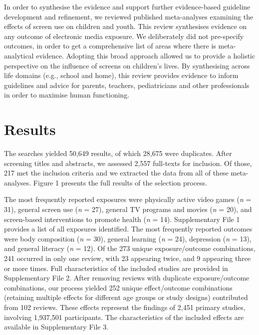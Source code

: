 \documentclass[
  english,
  man]{apa6}
\begin{document}
In order to synthesise the evidence and support further evidence-based guideline development and refinement, we reviewed published meta-analyses examining the effects of screen use on children and youth.
This review synthesises evidence on any outcome of electronic media exposure.
We deliberately did not pre-specify outcomes, in order to get a comprehensive list of areas where there is meta-analytical evidence.
Adopting this broad approach allowed us to provide a holistic perspective on the influence of screens on children's lives.
By synthesising across life domains (e.g., school and home), this review provides evidence to inform guidelines and advice for parents, teachers, pediatricians and other professionals in order to maximise human functioning.

\newpage

\hypertarget{results}{%
\section{Results}\label{results}}

The searches yielded 50,649 results, of which 28,675 were duplicates.
After screening titles and abstracts, we assessed 2,557 full-texts for inclusion.
Of those, 217 met the inclusion criteria and we extracted the data from all of these meta-analyses.
Figure 1 presents the full results of the selection process.

The most frequently reported exposures were physically active video games (\emph{n} = 31), general screen use (\emph{n} = 27), general TV programs and movies (\emph{n} = 20), and screen-based interventions to promote health (\emph{n} = 14).
Supplementary File 1 provides a list of all exposures identified.
The most frequently reported outcomes were body composition (\emph{n} = 30), general learning (\emph{n} = 24), depression (\emph{n} = 13), and general literacy (\emph{n} = 12).
Of the 273 unique exposure/outcome combinations, 241 occurred in only one review, with 23 appearing twice, and 9 appearing three or more times.
Full characteristics of the included studies are provided in Supplementary File 2.
After removing reviews with duplicate exposure/outcome combinations, our process yielded 252 unique effect/outcome combinations (retaining multiple effects for different age groups or study designs) contributed from 102 reviews.
These effects represent the findings of 2,451 primary studies, involving 1,937,501 participants.
The characteristics of the included effects are available in Supplementary File 3.
\end{document}
